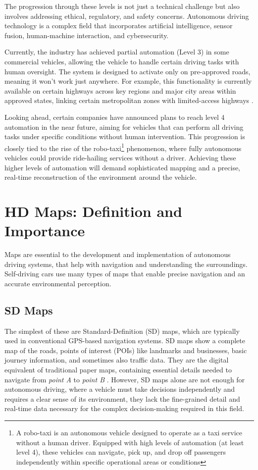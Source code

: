 The progression through these levels is not just a technical challenge but also involves addressing ethical, regulatory, and safety concerns. Autonomous driving technology is a complex field that incorporates artificial intelligence, sensor fusion, human-machine interaction, and cybersecurity. 

Currently, the industry has achieved partial automation (Level 3) in some commercial vehicles, allowing the vehicle to handle certain driving tasks with human oversight. The system is designed to activate only on pre-approved roads, meaning it won’t work just anywhere. For example, this functionality is currently available on certain highways across key regions and major city areas within approved states, linking certain metropolitan zones with limited-access highways \cite{bmw2024}.

Looking ahead, certain companies have announced plans to reach level 4 automation in the near future, aiming for vehicles that can perform all driving tasks under specific conditions without human intervention. This progression is closely tied to the rise of the robo-taxi\footnote{A robo-taxi is an autonomous vehicle designed to operate as a taxi service without a human driver. Equipped with high levels of automation (at least level 4), these vehicles can navigate, pick up, and drop off passengers independently within specific operational areas or conditions} phenomenon, where fully autonomous vehicles could provide ride-hailing services without a driver. Achieving these higher levels of automation will demand sophisticated mapping and a precise, real-time reconstruction of the environment around the vehicle.

\section{HD Maps: Definition and Importance}

Maps are essential to the development and implementation of autonomous driving systems, that help with navigation and understanding the surroundings. Self-driving cars use many types of maps that enable precise navigation and an accurate environmental perception. 

\subsection{SD Maps}
The simplest of these are Standard-Definition (SD) maps, which are typically used in conventional GPS-based navigation systems. SD maps show a complete map of the roads, points of interest (POIs) like landmarks and businesses, basic journey information, and sometimes also traffic data. They are the digital equivalent of traditional paper maps, containing essential details needed to navigate from \textit{point A} to \textit{point B} \cite{Mudduluru_SD_vs_HD_Maps, Chiang2021}.
However, SD maps alone are not enough for autonomous driving, where a vehicle must take decisions independently and requires a clear sense of its environment, they lack the fine-grained detail and real-time data necessary for the complex decision-making required in this field.

